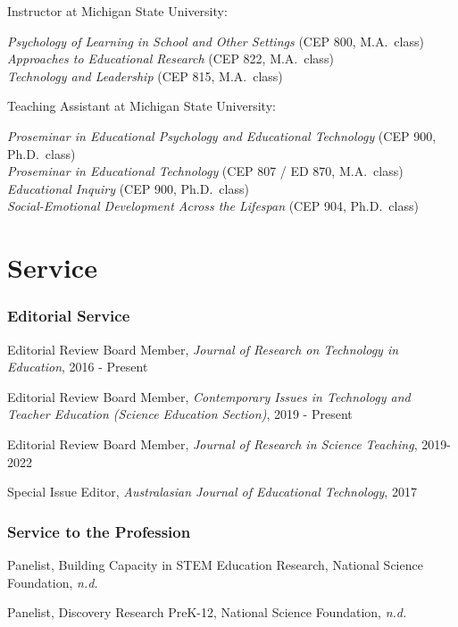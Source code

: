 \documentclass[
  14,
]{article}
\begin{document}
Instructor at Michigan State University:

\emph{Psychology of Learning in School and Other Settings} (CEP 800,
M.A.~class)\\
\emph{Approaches to Educational Research} (CEP 822, M.A.~class)\\
\emph{Technology and Leadership} (CEP 815, M.A.~class)

Teaching Assistant at Michigan State University:

\emph{Proseminar in Educational Psychology and Educational Technology}
(CEP 900, Ph.D.~class)\\
\emph{Proseminar in Educational Technology} (CEP 807 / ED 870,
M.A.~class)\\
\emph{Educational Inquiry} (CEP 900, Ph.D.~class)\\
\emph{Social-Emotional Development Across the Lifespan} (CEP 904,
Ph.D.~class)

\hypertarget{service}{%
\section{Service}\label{service}}

\hypertarget{editorial-service}{%
\subsubsection{Editorial Service}\label{editorial-service}}

Editorial Review Board Member, \emph{Journal of Research on Technology
in Education}, 2016 - Present

Editorial Review Board Member, \emph{Contemporary Issues in Technology
and Teacher Education (Science Education Section)}, 2019 - Present

Editorial Review Board Member, \emph{Journal of Research in Science
Teaching}, 2019-2022

Special Issue Editor, \emph{Australasian Journal of Educational
Technology}, 2017

\hypertarget{service-to-the-profession}{%
\subsubsection{Service to the
Profession}\label{service-to-the-profession}}

Panelist, Building Capacity in STEM Education Research, National Science
Foundation, \emph{n.d.}

Panelist, Discovery Research PreK-12, National Science Foundation,
\emph{n.d.}
\end{document}
